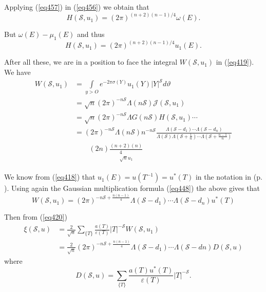Applying (\ref{eq457}) in (\ref{eq456}) we obtain that 
$$
H(\mathscr{S},u_1) = (2\pi)^{(n+2)(n-1)/4} \omega(E).
$$

But $\omega(E) - \mu_1(E)$ and thus
\begin{equation*}
H(\mathscr{S},u_1) = (2\pi )^{(n+2)(n-1)/4} u_1(E). \tag{458}\label{eq458}
\end{equation*}

After all these, we are in a position to face the integral
$W(\mathscr{S},u_1)$ in (\ref{eq419}). We have 
\begin{align*}
W(\mathscr{S},u_1) & = \int\limits_{y > O} e^{-2\pi\sigma(Y)} u_1(Y) |
Y |^\mathscr{S}   d\vartheta\\ 
& = \sqrt{n}(2\pi)^{-n\mathscr{S}}  \Lambda (n \mathscr{S})
\mathcal{J}(\mathscr{S},u_1)\\ 
& = \sqrt{n}(2\pi)^{-n\mathscr{S}}  \Lambda
G(n\mathscr{S})H(\mathscr{S},u_1) \cdots\\ 
& = (2\pi )^{-n\mathscr{S}}   \Lambda (n\mathscr{S})
n^{-n\mathscr{S}} \frac{\Lambda(\mathscr{S} -d_1) \cdots
  \Lambda(\mathscr{S}-d_n)}{\Lambda(\mathscr{S})\Lambda(\mathscr{S}+
  \frac{1}{n}) \cdots \Lambda (\mathscr{S} + \frac{n-1}{n})}\\
& \qquad  (2n)
\frac{(n+2)(n)}{\begin{matrix}4 \\ \sqrt{n}   u_1 \end{matrix}} 
\end{align*}\pageoriginale

We know from (\ref{eq418}) that $u_1(E) = u(T^{-1}) = u^*(T)$ in the
notation in (p. \pageref{p.279}). Using again the Gaussian
multiplication formula 
(\ref{eq448}) the above gives that  
\begin{equation*}
W(\mathscr{S},u_1) = (2\pi )^{-n\mathscr{S}+ \frac{n(n-1)}{4}}
\Lambda(\mathscr{S} - d_1) \cdots   \Lambda(\mathscr{S} - d_n)   u^*
(T) \tag{459}\label{eq459} 
\end{equation*}

Then from (\ref{eq420})
\begin{align*}
\xi(\mathscr{S},u) & = \frac{2}{\sqrt{n}} \sum_{ \{ T \} }
\frac{a(T)}{\varepsilon(T)}   | T |^{-\mathscr{S}}
W(\mathscr{S},u_1)\\ 
& = \frac{2}{\sqrt{n}}(2\pi)^{-n\mathscr{S} + \frac{n(n-1)}{4}}
\Lambda{(\mathscr{S} - d_1)} \cdots \Lambda(\mathscr{S}-dn)
D(\mathscr{S},u) \tag{460}\label{eq460} 
\end{align*}
where
\begin{equation*}
D(\mathscr{S},u) = \sum_{\{ T \}} \frac{a(T)u^*(T)}{\varepsilon(T)}
| T |^{- \mathscr{S}}. \tag{461}\label{eq461} 
\end{equation*}

